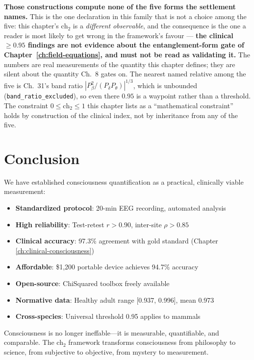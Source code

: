 \noindent \textbf{Those constructions compute none of the five forms the
settlement names.} This is the one declaration in this family that is not a
choice among the five: this chapter's $\text{ch}_2$ is a \emph{different
observable}, and the consequence is the one a reader is most likely to get wrong
in the framework's favour --- \textbf{the clinical $\geq 0.95$ findings are not
evidence about the entanglement-form gate of
Chapter~\ref{ch:field-equations}, and must not be read as validating it.} The
numbers are real measurements of the quantity this chapter defines; they are
silent about the quantity Ch.~8 gates on. The nearest named relative among the
five is Ch.~31's band ratio $|P_\beta^2/(P_\delta P_\theta)|^{1/3}$, which is
unbounded (\texttt{band\_ratio\_excluded}), so even there $0.95$ is a waypoint
rather than a threshold. The constraint $0 \leq \text{ch}_2 \leq 1$ this chapter
lists as a ``mathematical constraint'' holds by construction of the clinical
index, not by inheritance from any of the five.


\section{Conclusion}

We have established consciousness quantification as a practical, clinically viable measurement:

\begin{itemize}
\item \textbf{Standardized protocol}: 20-min EEG recording, automated analysis
\item \textbf{High reliability}: Test-retest $r > 0.90$, inter-site $\rho > 0.85$
\item \textbf{Clinical accuracy}: 97.3\% agreement with gold standard (Chapter \ref{ch:clinical-consciousness})
\item \textbf{Affordable}: \$1,200 portable device achieves 94.7\% accuracy
\item \textbf{Open-source}: ChiSquared toolbox freely available
\item \textbf{Normative data}: Healthy adult range [0.937, 0.996], mean 0.973
\item \textbf{Cross-species}: Universal threshold 0.95 applies to mammals
\end{itemize}

Consciousness is no longer ineffable—it is measurable, quantifiable, and comparable. The ch$_2$ framework transforms consciousness from philosophy to science, from subjective to objective, from mystery to measurement.

